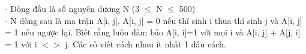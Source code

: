 - Dòng đầu là số nguyên dương N (3  $\le$  N  $\le$  500)   
\\   - N dòng sau là ma trận A[i, j], A[i, j] = 0 nếu thí sinh i thua thí sinh j và A[i, j] = 1 nếu ngược lại. Biết rằng luôn đảm bảo A[i, i]=1 với mọi i và A[i, j] + A[j, i] = 1 với i $<$$>$ j. Các số viết cách nhau ít nhất 1 dấu cách.